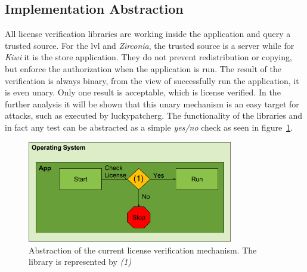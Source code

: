 \subsection{Implementation Abstraction} \label{section:license-abstraction}
All license verification libraries are working inside the application and query a trusted source.
For the \gls{lvl} and \textit{Zirconia}, the trusted source is a server while for \textit{Kiwi} it is the store application.
They do not prevent redistribution or copying, but enforce the authorization when the application is run.
The result of the verification is always binary, from the view of successfully run the application, it is even unary.
Only one result is acceptable, which is license verified.
In the further analysis it will be shown that this unary mechanism is an easy target for attacks, such as executed by \gls{luckypatcherg}.
\newline
The functionality of the libraries and in fact any test can be abstracted as a simple \textit{yes/no} check as seen in figure~\ref{fig:verificationNow}.
\begin{figure}[h]
    \centering
    \includegraphics[width=0.8\textwidth]{data/verificationNow.png}
    \caption{Abstraction of the current license verification mechanism. The library is represented by \textit{(1)}}
    \label{fig:verificationNow}
\end{figure}
